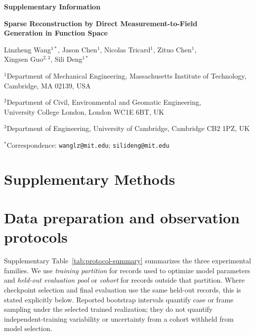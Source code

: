 \documentclass[11pt]{article}
\begin{document}
\begin{center}
{\large\bfseries Supplementary Information\par}
\vspace{0.6em}
{\Large\bfseries Sparse Reconstruction by Direct Measurement-to-Field\\
Generation in Function Space\par}
\vspace{0.9em}
Linzheng Wang$^{1*}$, Jason Chen$^1$, Nicolas Tricard$^1$, Zituo Chen$^1$,\\
Xingsen Guo$^{2,3}$, Sili Deng$^{1*}$\par
\vspace{0.4em}
\small
$^1$Department of Mechanical Engineering, Massachusetts Institute of Technology,\\
Cambridge, MA 02139, USA\par
$^2$Department of Civil, Environmental and Geomatic Engineering,\\
University College London, London WC1E 6BT, UK\par
$^3$Department of Engineering, University of Cambridge, Cambridge CB2 1PZ, UK\par
\vspace{0.3em}
$^*$Correspondence: \texttt{wanglz@mit.edu}; \texttt{silideng@mit.edu}
\end{center}

\vspace{0.4em}
\begingroup
\small
\setlength{\parskip}{0pt}
\tableofcontents
\endgroup
\clearpage
\section*{Supplementary Methods}

\FloatBarrier
{}
\section{Data preparation and observation protocols}
\label{sec:data}

Supplementary Table~\ref{tab:protocol-summary} summarizes the three experimental families. We use \emph{training partition} for records used to optimize model parameters and \emph{held-out evaluation pool} or \emph{cohort} for records outside that partition. Where checkpoint selection and final evaluation use the same held-out records, this is stated explicitly below. Reported bootstrap intervals quantify case or frame sampling under the selected trained realization; they do not quantify independent-training variability or uncertainty from a cohort withheld from model selection.
\end{document}
